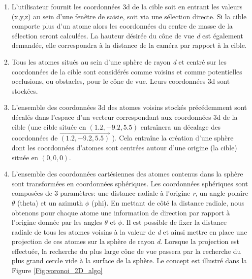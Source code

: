 \begin{enumerate}
	\item L'utilisateur fournit les coordonnées 3d de la cible soit en entrant les valeurs (x,y,z) au sein d'une fenêtre de saisie, soit via une sélection directe. Si la cible comporte plus d'un atome alors les coordonnées du centre de masse de la sélection seront calculées. La hauteur désirée du cône de vue \textit{d} est également demandée, elle correspondra à la distance de la caméra par rapport à la cible.
	\item Tous les atomes situés au sein d'une sphère de rayon \textit{d} et centré sur les coordonnées de la cible sont considérés comme voisins et comme potentielles occlusions, ou obstacles, pour le cône de vue. Leurs coordonnées 3d sont stockées.
	\item L'ensemble des coordonnées 3d des atomes voisins stockés précédemment sont décalés dans l'espace d'un vecteur correspondant aux coordonnées 3d de la cible (une cible située en $(1.2,-9.2,5.5)$ entraînera un décalage des coordonnées de $\overrightarrow{(1.2,-9.2,5.5)}$ ). Cela entraîne la création d'une sphère dont les coordonnées d'atomes sont centrées autour d'une origine (la cible) située en $(0,0,0)$.
	\item L'ensemble des coordonnées cartésiennes des atomes contenus dans la sphère sont transformées en coordonnées sphériques. Les coordonnées sphériques sont composées de 3 paramètres: une distance radiale à l'origine \textit{r}, un angle polaire $\theta$ (theta) et un azimuth $\phi$ (phi). En mettant de côté la distance radiale, nous obtenons pour chaque atome une information de direction par rapport à l'origine donnée par les angles $\theta$ et $\phi$. Il est possible de fixer la distance radiale de tous les atomes voisins à la valeur de \textit{d} et ainsi mettre en place une projection de ces atomes sur la sphère de rayon \textit{d}. Lorsque la projection est effectuée, la recherche du plus large cône de vue passera par la recherche du plus grand cercle vide à la surface de la sphère. Le concept est illustré dans la Figure \ref{Fig:voronoi_2D_algo}

\end{enumerate}
